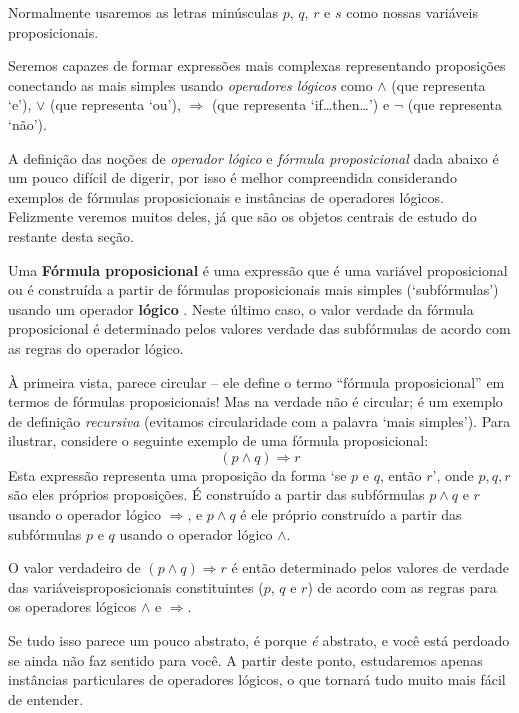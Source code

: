 Normalmente usaremos as letras minúsculas $p$, $q$, $r$ e $s$ como nossas variáveis ​​proposicionais.

Seremos capazes de formar expressões mais complexas representando proposições conectando as mais simples usando \textit{operadores lógicos} como $\wedge$ (que representa `e'), $\vee$ (que representa `ou'), $ \Rightarrow$ (que representa `if\dots{}then\dots{}') e $\neg$ (que representa `não').

A definição das noções de \textit{operador lógico} e \textit{fórmula proposicional} dada abaixo é um pouco difícil de digerir, por isso é melhor compreendida considerando exemplos de fórmulas proposicionais e instâncias de operadores lógicos. Felizmente veremos muitos deles, já que são os objetos centrais de estudo do restante desta seção.

\begin{definition}
\label{defPropositionalFormula}
\label{defLogicalOperator}
Uma \textbf{Fórmula proposicional} é uma expressão que é uma variável proposicional ou é construída a partir de fórmulas proposicionais mais simples (`subfórmulas') usando um operador \textbf{\mbox{lógico} \mbox{}}. Neste último caso, o valor verdade da fórmula proposicional é determinado pelos valores verdade das subfórmulas de acordo com as regras do operador lógico.
\end{definition}

À primeira vista,  parece circular – ele define o termo “fórmula proposicional” em termos de fórmulas proposicionais! Mas na verdade não é circular; é um exemplo de definição \textit{recursiva} (evitamos circularidade com a palavra `mais simples'). Para ilustrar, considere o seguinte exemplo de uma fórmula proposicional:
\[
(p \wedge q) \Rightarrow r
\]
Esta expressão representa uma proposição da forma `se $p$ e $q$, então $r$', onde $p,q,r$ são eles próprios proposições. É construído a partir das subfórmulas $p \wedge q$ e $r$ usando o operador lógico $\Rightarrow$, e $p \wedge q$ é ele próprio construído a partir das subfórmulas $p$ e $q$ usando o operador lógico $\wedge$.

O valor verdadeiro de $(p \wedge q) \Rightarrow r$ é então determinado pelos valores de verdade das variáveis ​​proposicionais constituintes ($p$, $q$ e $r$) de acordo com as regras para os operadores lógicos $\wedge$ e $\Rightarrow$.

Se tudo isso parece um pouco abstrato, é porque \textit{é} abstrato, e você está perdoado se ainda não faz sentido para você. A partir deste ponto, estudaremos apenas instâncias particulares de operadores lógicos, o que tornará tudo muito mais fácil de entender.

